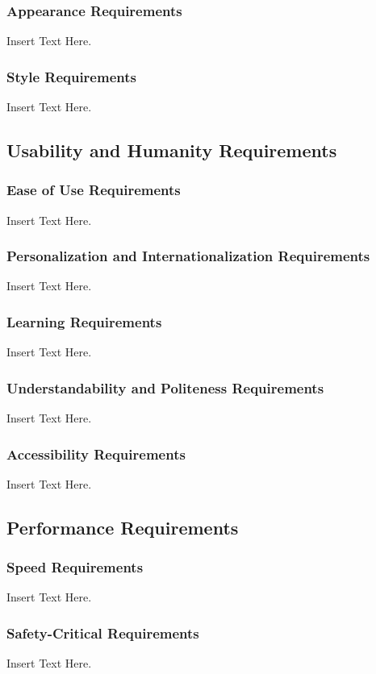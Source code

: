 \documentclass [12pt]{article}
\begin{document}
\subsubsection{Appearance Requirements}
Insert Text Here. 

\subsubsection{Style Requirements}
Insert Text Here. 


\subsection{Usability and Humanity Requirements} 
\subsubsection{Ease of Use Requirements}
Insert Text Here.

\subsubsection{Personalization and Internationalization Requirements}
Insert Text Here.

\subsubsection{Learning Requirements }
Insert Text Here.

\subsubsection{Understandability and Politeness Requirements}
Insert Text Here.
		
\subsubsection{Accessibility Requirements }
Insert Text Here.
 
\subsection{Performance Requirements}
\subsubsection{Speed Requirements }
Insert Text Here. 

\subsubsection{Safety-Critical Requirements }
		Insert Text Here. 	
\end{document}
